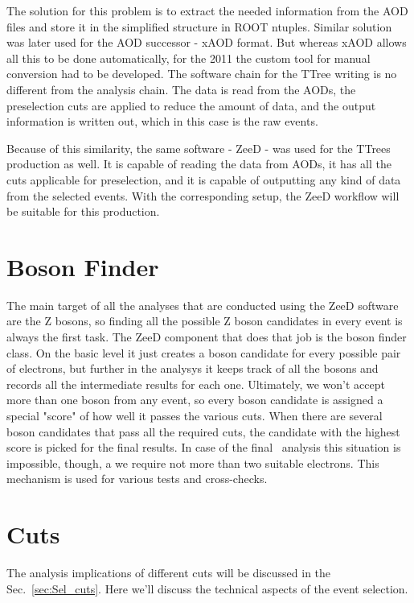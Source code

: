 The solution for this problem is to extract the needed information from the AOD files and store it in the simplified structure in ROOT ntuples. Similar solution was later used for the AOD successor - xAOD format. But whereas xAOD allows all this to be done automatically, for the 2011 the custom tool for manual conversion had to be developed. The software chain for the TTree writing is no different from the analysis chain. The data is read from the AODs, the preselection cuts are applied to reduce the amount of data, and the output information is written out, which in this case is the raw events.

Because of this similarity, the same software - ZeeD - was used for the TTrees production as well. It is capable of reading the data from AODs, it has all the cuts applicable for preselection, and it is capable of outputting any kind of data from the selected events. With the corresponding setup, the ZeeD workflow will be suitable for this production.

\section{Boson Finder}

The main target of all the analyses that are conducted using the ZeeD software are the Z bosons, so finding all the possible Z boson candidates in every event is always the first task. The ZeeD component that does that job is the boson finder class. On the basic level it just creates a boson candidate for every possible pair of electrons, but further in the analysys it keeps track of all the bosons and records all the intermediate results for each one. Ultimately, we won't accept more than one boson from any event, so every boson candidate is assigned a special "score" of how well it passes the various cuts. When there are several boson candidates that pass all the required cuts, the candidate with the highest score is picked for the final results. In case of the final \Zee\ analysis this situation is impossible, though, a we require not more than two suitable electrons. This mechanism is used for various tests and cross-checks.

\section{Cuts}

The analysis implications of different cuts will be discussed in the Sec.~\ref{sec:Sel_cuts}. Here we'll discuss the technical aspects of the event selection.


